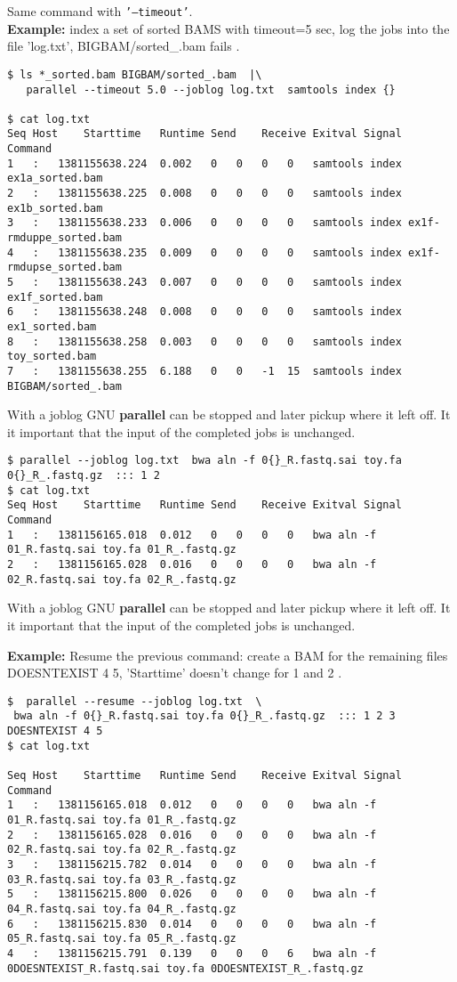 \documentclass{article}
\newcommand{\example}[1]{
\textbf{Example: } {\color[rgb]{0,0,1} #1 } .
}
\newcommand{\cmdoption}[1]{\texttt{'#1'}}
\def\prl{\textbf{parallel}}
\begin{document}
Same command with \cmdoption{--timeout}.\\
\example{index a set of sorted BAMS with timeout=5 sec, log the jobs into the file 'log.txt', BIGBAM/sorted\_.bam fails}
\begin{lstlisting}
$ ls *_sorted.bam BIGBAM/sorted_.bam  |\
   parallel --timeout 5.0 --joblog log.txt  samtools index {}

$ cat log.txt
Seq	Host	Starttime	Runtime	Send	Receive	Exitval	Signal	Command
1	:	1381155638.224	0.002	0	0	0	0	samtools index ex1a_sorted.bam
2	:	1381155638.225	0.008	0	0	0	0	samtools index ex1b_sorted.bam
3	:	1381155638.233	0.006	0	0	0	0	samtools index ex1f-rmduppe_sorted.bam
4	:	1381155638.235	0.009	0	0	0	0	samtools index ex1f-rmdupse_sorted.bam
5	:	1381155638.243	0.007	0	0	0	0	samtools index ex1f_sorted.bam
6	:	1381155638.248	0.008	0	0	0	0	samtools index ex1_sorted.bam
8	:	1381155638.258	0.003	0	0	0	0	samtools index toy_sorted.bam
7	:	1381155638.255	6.188	0	0	-1	15	samtools index BIGBAM/sorted_.bam
\end{lstlisting}
With a joblog GNU \prl{} can be stopped and later pickup where it left off. It it important that the input of the completed jobs is unchanged.
\begin{lstlisting}
$ parallel --joblog log.txt  bwa aln -f 0{}_R.fastq.sai toy.fa 0{}_R_.fastq.gz  ::: 1 2
$ cat log.txt
Seq	Host	Starttime	Runtime	Send	Receive	Exitval	Signal	Command
1	:	1381156165.018	0.012	0	0	0	0	bwa aln -f 01_R.fastq.sai toy.fa 01_R_.fastq.gz
2	:	1381156165.028	0.016	0	0	0	0	bwa aln -f 02_R.fastq.sai toy.fa 02_R_.fastq.gz
\end{lstlisting}
With a joblog GNU \prl{} can be stopped and later pickup where it left off. It it important that the input of the completed jobs is unchanged.
\example{Resume the previous command: create a BAM  for the remaining files  DOESNTEXIST 4 5, 'Starttime' doesn't change for 1 and 2 }
\begin{lstlisting}
$  parallel --resume --joblog log.txt  \
 bwa aln -f 0{}_R.fastq.sai toy.fa 0{}_R_.fastq.gz  ::: 1 2 3 DOESNTEXIST 4 5
$ cat log.txt

Seq	Host	Starttime	Runtime	Send	Receive	Exitval	Signal	Command
1	:	1381156165.018	0.012	0	0	0	0	bwa aln -f 01_R.fastq.sai toy.fa 01_R_.fastq.gz
2	:	1381156165.028	0.016	0	0	0	0	bwa aln -f 02_R.fastq.sai toy.fa 02_R_.fastq.gz
3	:	1381156215.782	0.014	0	0	0	0	bwa aln -f 03_R.fastq.sai toy.fa 03_R_.fastq.gz
5	:	1381156215.800	0.026	0	0	0	0	bwa aln -f 04_R.fastq.sai toy.fa 04_R_.fastq.gz
6	:	1381156215.830	0.014	0	0	0	0	bwa aln -f 05_R.fastq.sai toy.fa 05_R_.fastq.gz
4	:	1381156215.791	0.139	0	0	0	6	bwa aln -f 0DOESNTEXIST_R.fastq.sai toy.fa 0DOESNTEXIST_R_.fastq.gz
\end{lstlisting}
\end{document}
